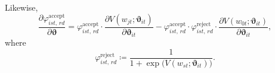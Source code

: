 \documentclass[12pt]{article}
\theoremstyle{plain}
\begin{document}
Likewise,
\begin{equation*}
  \frac{\partial \varphi^{\text{accept}}_{ist, \, rd} }{\partial \bm{\vartheta}} = \varphi^{\text{accept}}_{ist, \, rd}  \cdot \frac{\partial V(w_{jt}; \bm{\vartheta}_{it})}{\partial \bm{\vartheta}_{it}}  - \varphi^{\text{accept}}_{ist, \, rd} \cdot \varphi^{\text{reject}}_{ist, \, rd} \cdot \frac{\partial V(w_{0t}; \bm{\vartheta}_{it})}{\partial \bm{\vartheta}_{it}}, 
\end{equation*}
where 
\begin{equation*}
  \varphi^{\text{reject}}_{ist, \, rd} \coloneq \frac{1}{1 + \exp \big(  V(w_{st}; \bm{\vartheta}_{it}) \big)}.
\end{equation*}
\end{document}
